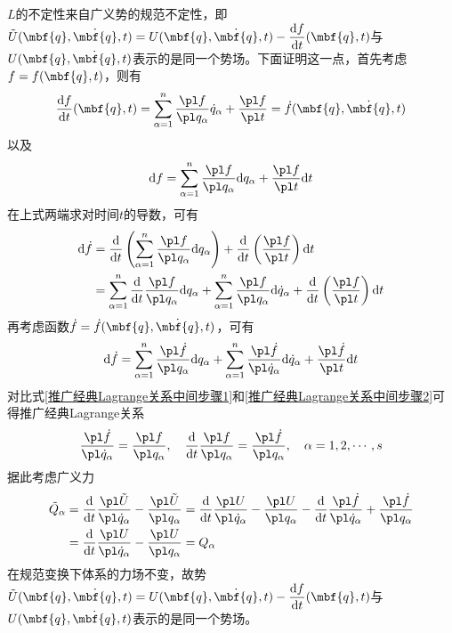 $L$的不定性来自广义势的规范不定性，即$\tilde{U}(\mbf{q},\dot{\mbf{q}},t) = U(\mbf{q},\dot{\mbf{q}},t) - \dfrac{\mathrm{d} f}{\mathrm{d} t}(\mbf{q},t)$与$U(\mbf{q},\dot{\mbf{q}},t)$表示的是同一个势场。下面证明这一点，首先考虑$f = f(\mbf{q},t)$，则有
\begin{equation*}
	\dfrac{\mathrm{d} f}{\mathrm{d} t}(\mbf{q},t) = \sum_{\alpha=1}^n \frac{\pl f}{\pl q_\alpha} \dot{q}_\alpha + \frac{\pl f}{\pl t} = \dot{f}(\mbf{q},\dot{\mbf{q}},t)
\end{equation*}
以及
\begin{equation*}
	\mathrm{d} f = \sum_{\alpha=1}^n \frac{\pl f}{\pl q_\alpha} \mathrm{d} q_\alpha + \frac{\pl f}{\pl t} \mathrm{d} t
\end{equation*}
在上式两端求对时间$t$的导数，可有
\begin{align}
	\mathrm{d} \dot{f} & = \frac{\mathrm{d}}{\mathrm{d} t} \left(\sum_{\alpha=1}^n \frac{\pl f}{\pl q_\alpha} \mathrm{d} q_\alpha\right) + \frac{\mathrm{d}}{\mathrm{d} t} \left(\frac{\pl f}{\pl t}\right) \mathrm{d} t \nonumber \\
	& = \sum_{\alpha=1}^n \frac{\mathrm{d}}{\mathrm{d} t} \frac{\pl f}{\pl q_\alpha} \mathrm{d} q_\alpha + \sum_{\alpha=1}^n \frac{\pl f}{\pl q_\alpha} \mathrm{d} \dot{q}_\alpha + \frac{\mathrm{d}}{\mathrm{d} t} \left(\frac{\pl f}{\pl t}\right) \mathrm{d} t
	\label{推广经典Lagrange关系中间步骤1}
\end{align}
再考虑函数$\dot{f} = \dot{f}(\mbf{q},\dot{\mbf{q}},t)$，可有
\begin{equation}
	\mathrm{d} \dot{f} = \sum_{\alpha=1}^n \frac{\pl \dot{f}}{\pl q_\alpha} \mathrm{d} q_\alpha + \sum_{\alpha=1}^n \frac{\pl \dot{f}}{\pl \dot{q}_\alpha} \mathrm{d} \dot{q}_\alpha + \frac{\pl \dot{f}}{\pl t} \mathrm{d} t
	\label{推广经典Lagrange关系中间步骤2}
\end{equation}
对比式\eqref{推广经典Lagrange关系中间步骤1}和\eqref{推广经典Lagrange关系中间步骤2}可得{\heiti 推广经典Lagrange关系}
\begin{equation}
	\frac{\pl \dot{f}}{\pl \dot{q}_\alpha} = \frac{\pl f}{\pl q_\alpha},\quad \frac{\mathrm{d}}{\mathrm{d} t} \frac{\pl f}{\pl q_\alpha} = \frac{\pl \dot{f}}{\pl q_\alpha},\quad \alpha = 1,2,\cdots,s
	\label{推广经典Lagrange关系}
\end{equation}
据此考虑广义力
\begin{align*}
	\tilde{Q}_\alpha & = \frac{\mathrm{d}}{\mathrm{d} t} \frac{\pl \tilde{U}}{\pl \dot{q}_\alpha} - \frac{\pl \tilde{U}}{\pl q_\alpha} = \frac{\mathrm{d}}{\mathrm{d} t} \frac{\pl U}{\pl \dot{q}_\alpha} - \frac{\pl U}{\pl q_\alpha} - \frac{\mathrm{d}}{\mathrm{d} t} \frac{\pl \dot{f}}{\pl \dot{q}_\alpha} + \frac{\pl \dot{f}}{\pl q_\alpha} \\
	& = \frac{\mathrm{d}}{\mathrm{d} t} \frac{\pl U}{\pl \dot{q}_\alpha} - \frac{\pl U}{\pl q_\alpha} = Q_\alpha	
\end{align*}
在规范变换下体系的力场不变，故势$\tilde{U}(\mbf{q},\dot{\mbf{q}},t) = U(\mbf{q},\dot{\mbf{q}},t) - \dfrac{\mathrm{d} f}{\mathrm{d} t}(\mbf{q},t)$与$U(\mbf{q},\dot{\mbf{q}},t)$表示的是同一个势场。

